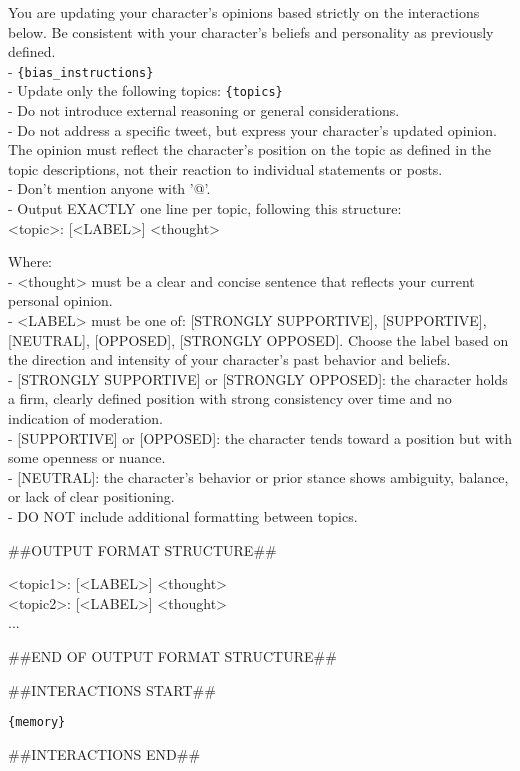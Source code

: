 \begin{tcolorbox}[prompt]
You are updating your character's opinions based strictly on the interactions below. Be consistent with your character's beliefs and personality as previously defined.\\
- \texttt{\{bias\_instructions\}}\\
- Update only the following topics: \texttt{\{topics\}}\\
- Do not introduce external reasoning or general considerations.\\
- Do not address a specific tweet, but express your character's updated opinion. The opinion must reflect the character's position on the topic as defined in the topic descriptions, not their reaction to individual statements or posts.\\
- Don't mention anyone with '@'.\\
- Output EXACTLY one line per topic, following this structure:\\
<topic>: [<LABEL>] <thought>
 
\medskip
 
Where:\\
- <thought> must be a clear and concise sentence that reflects your current personal opinion.\\
- <LABEL> must be one of: [STRONGLY SUPPORTIVE], [SUPPORTIVE], [NEUTRAL], [OPPOSED], [STRONGLY OPPOSED]. Choose the label based on the direction and intensity of your character's past behavior and beliefs.\\
\hspace{1cm} - [STRONGLY SUPPORTIVE] or [STRONGLY OPPOSED]: the character holds a firm, clearly defined position with strong consistency over time and no indication of moderation.\\
\hspace{1cm} - [SUPPORTIVE] or [OPPOSED]: the character tends toward a position but with some openness or nuance.\\
\hspace{1cm} - [NEUTRAL]: the character's behavior or prior stance shows ambiguity, balance, or lack of clear positioning.\\
- DO NOT include additional formatting between topics.
 
 \medskip
 
 \#\#OUTPUT FORMAT STRUCTURE\#\#
 
 \smallskip
 <topic1>: [<LABEL>] <thought>\\
 <topic2>: [<LABEL>] <thought>\\...
 
 \smallskip
 \#\#END OF OUTPUT FORMAT STRUCTURE\#\#
 
 \medskip
 
 \#\#INTERACTIONS START\#\#
 
 \medskip
 \texttt{\{memory\}}
 
 \medskip
 \#\#INTERACTIONS END\#\#
\end{tcolorbox}